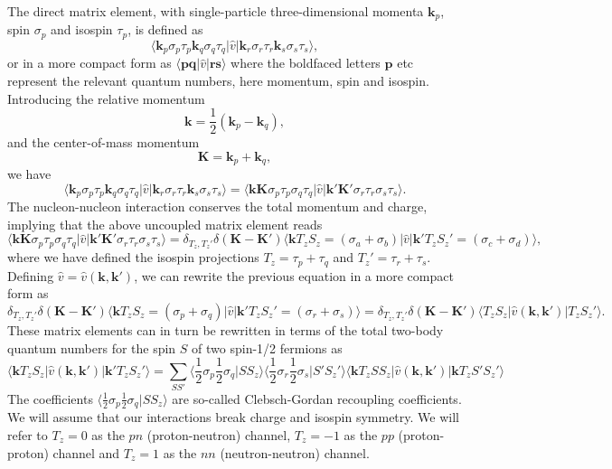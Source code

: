 The direct matrix element, with single-particle three-dimensional
momenta $\mathbf{k}_p$, spin $\sigma_p$ and isospin $\tau_p$, is
defined as
\[
\langle \mathbf{k}_p\sigma_p\tau_p \mathbf{k}_q\sigma_q\tau_q \vert \hat{v}\vert \mathbf{k}_r\sigma_r\tau_r \mathbf{k}_s\sigma_s\tau_s \rangle, 
\]
or in a more compact form as
$\langle \mathbf{p}\mathbf{q}\vert \hat{v} \vert \mathbf{r}\mathbf{s} \rangle$
where the boldfaced letters $\mathbf{p}$ etc represent the relevant
quantum numbers, here momentum, spin and isospin. Introducing the
relative momentum
\[
\mathbf{k} = \frac{1}{2}\left(\mathbf{k}_p-\mathbf{k}_q\right), 
\]
and the center-of-mass momentum
\[
\mathbf{K} = \mathbf{k}_p+\mathbf{k}_q,
\]
we have 
\[
\langle \mathbf{k}_p\sigma_p\tau_p \mathbf{k}_q\sigma_q\tau_q \vert \hat{v}\vert \mathbf{k}_r\sigma_r\tau_r \mathbf{k}_s\sigma_s\tau_s \rangle=\langle \mathbf{k}\mathbf{K}\sigma_p\tau_p \sigma_q\tau_q \vert \hat{v}\vert \mathbf{k}'\mathbf{K}'\sigma_r\tau_r \sigma_s\tau_s \rangle.
\]
The nucleon-nucleon interaction conserves the total momentum and charge, implying that the above uncoupled matrix element reads
\[
\langle \mathbf{k}\mathbf{K}\sigma_p\tau_p \sigma_q\tau_q \vert \hat{v}\vert \mathbf{k}'\mathbf{K}'\sigma_r\tau_r \sigma_s\tau_s \rangle=\delta_{T_z,T_z'}\delta(\mathbf{K}-\mathbf{K}')\langle \mathbf{k}T_zS_z=(\sigma_a+\sigma_b) \vert \hat{v}\vert \mathbf{k}'T_zS_z'=(\sigma_c+\sigma_d) \rangle,
\]
where we have defined the isospin projections $T_z=\tau_p+\tau_q$ and
$T_z'=\tau_r+\tau_s$.  Defining
$\hat{v}=\hat{v}(\mathbf{k},\mathbf{k}' )$, we can rewrite the
previous equation in a more compact form as
\[
\delta_{T_z,T_z'}\delta(\mathbf{K}-\mathbf{K}')\langle \mathbf{k}T_zS_z=(\sigma_p+\sigma_q) \vert \hat{v}\vert \mathbf{k}'T_zS_z'=(\sigma_r+\sigma_s) \rangle=\delta_{T_z,T_z'}\delta(\mathbf{K}-\mathbf{K}')\langle T_zS_z\vert\hat{v}(\mathbf{k},\mathbf{k}' ) \vert T_zS_z' \rangle.
\]
These matrix elements can in turn be rewritten in terms of the total
two-body quantum numbers for the spin $S$ of two spin-1/2 fermions as
\[
\langle \mathbf{k}T_zS_z \vert \hat{v}(\mathbf{k},\mathbf{k}' )\vert \mathbf{k}'T_zS_z' \rangle=\sum_{SS'}\langle \frac{1}{2}\sigma_p\frac{1}{2}\sigma_q\vert SS_z\rangle \langle \frac{1}{2}\sigma_r\frac{1}{2}\sigma_s\vert S'S_z'\rangle \langle \mathbf{k}T_zSS_z\vert \hat{v}(\mathbf{k},\mathbf{k}' )\vert \mathbf{k}T_zS'S_z' \rangle
\]
The coefficients $\langle \frac{1}{2}\sigma_p\frac{1}{2}\sigma_q\vert
SS_z\rangle$ are so-called Clebsch-Gordan recoupling coefficients.  We
will assume that our interactions break charge and isospin
symmetry. We will refer to $T_z=0$ as the $pn$ (proton-neutron)
channel, $T_z=-1$ as the $pp$ (proton-proton) channel and $T_z=1$ as
the $nn$ (neutron-neutron) channel.

